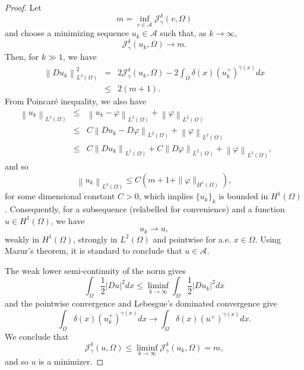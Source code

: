 \documentclass[reqno,11pt]{amsart}
\newcommand{\1}{\mathds{1}}
\numberwithin{equation}{section}
\begin{document}
\begin{proof}
Let 
$$m = \inf_{v\in {\mathcal A} } \mathcal{J}^\delta_\gamma(v, \Omega)$$
and choose a minimizing sequence $u_k \in {\mathcal A} $ such that, as $k\to \infty$,
$$\mathcal{J}^\delta_\gamma(u_k, \Omega) \longrightarrow m.$$
Then, for $k \gg 1$, we have
\begin{eqnarray*}
 \left\| Du_k \right\|_{L^2(\Omega)}^2 & = &  2\mathcal{J}^\delta_\gamma(u_k, \Omega) - 2 \int_{\Omega} \delta(x) (u_k^+)^{\gamma(x)} dx \\
 & \leq & 2(m+1).
\end{eqnarray*}
From Poincar\'e inequality, we also have
\begin{eqnarray}
\left\|u_k \right\|_{L^2(\Omega)}&  \leq & \left\| u_k - \varphi \right\|_{L^2(\Omega)} + \left\| \varphi \right\|_{L^2(\Omega)} \qquad \nonumber \\
& \leq & C \left\| Du_k - D\varphi \right\|_{L^2(\Omega)} + \left\| \varphi \right\|_{L^2(\Omega)} \qquad \nonumber \\
& \leq & C \left\| Du_k \right\|_{L^2(\Omega)}  +  C \left\|  D\varphi \right\|_{L^2(\Omega)} + \left\| \varphi \right\|_{L^2(\Omega)}, \qquad \nonumber
\end{eqnarray}
and so
\begin{equation}\label{ramp}
\left\|u_k \right\|_{L^2(\Omega)} \leq C\left(m + 1 + \|\varphi\|_{H^1(\Omega)}\right),    
\end{equation}
for some dimensional constant $C>0$, which implies $\{u_k\}_k$ is bounded in $H^1(\Omega)$. Consequently, for a subsequence (relabelled for convenience) and a function $u \in H^1 (\Omega)$, we have
$$u_k \longrightarrow u,$$
weakly in $H^1 (\Omega)$, strongly in $L^2 (\Omega)$ and pointwise for a.e. $x \in \Omega$. Using Mazur's theorem, it is standard to conclude that $u \in {\mathcal A} $.

The weak lower semi-continuity of the norm gives 
$$\int_{\Omega} \frac{1}{2} \left| Du \right|^2 dx \leq \liminf_{k\to \infty} \int_{\Omega} \frac{1}{2} \left| Du_k \right|^2 dx$$
and the pointwise convergence and Lebesgue's dominated convergence give
$$\int_{\Omega} \delta(x) (u_k^+)^{\gamma(x)} dx \longrightarrow \int_{\Omega} \delta(x) (u^+)^{\gamma(x)} dx.$$
We conclude that
$$\mathcal{J}^\delta_\gamma(u, \Omega)  \leq  \liminf_{k\to \infty} \mathcal{J}^\delta_\gamma(u_k, \Omega) = m,$$
and so $u$ is a minimizer.


\end{proof}
\end{document}
